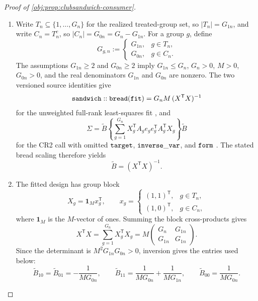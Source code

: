 \begin{proof}[Proof of \cref{obj:prop:clubsandwich-consumer}]
\begin{enumerate}
\item
Write \(T_n\subseteq\{1,\ldots,G_n\}\) for the realized treated-group set, so
\(|T_n|=G_{1n}\), and write \(C_n=T_n^{c}\), so
\(|C_n|=G_{0n}=G_n-G_{1n}\).  For a group \(g\), define
\[
G_{g,n}:=
\begin{cases}
G_{1n},& g\in T_n,\\
G_{0n},& g\in C_n.
\end{cases}
\]
The assumptions \(G_{1n}\ge2\) and \(G_{0n}\ge2\) imply \(G_{1n}\le G_n\),
\(G_n>0\), \(M>0\), \(G_{0n}>0\), and the real denominators
\(G_{1n}\) and \(G_{0n}\) are nonzero.  The two versioned source identities give
\[
{\tt sandwich::bread}({\tt fit})
=
G_nM\,(X^{\mathsf T}X)^{-1}
\]
for the unweighted full-rank least-squares fit
\citep[R/bread.R, lines 10--15]{Sandwich2026}, and
\[
\Sigma
=
\widetilde B
\left\{
\sum_{g=1}^{G_n}X_g^{\mathsf T}A_ge_ge_g^{\mathsf T}A_g^{\mathsf T}X_g
\right\}
\widetilde B
\]
for the CR2 call with omitted \({\tt target}\), \({\tt inverse\_var}\), and
\({\tt form}\)
\citep[R/lm.R, lines 47--52 and 70--72; R/S3-methods.R, lines 21--33 and
63--65; R/clubSandwich.R, lines 167--175, 216--225, and 237--287;
R/CR-adjustments.R, lines 5--7 and 22--42]{ClubSandwich2026}.  The stated bread
scaling therefore yields
\[
\widetilde B=(X^{\mathsf T}X)^{-1}.
\]

\item
The fitted design has group block
\[
X_g=\mathbf 1_M x_g^{\mathsf T},
\qquad
x_g=
\begin{cases}
(1,1)^{\mathsf T},& g\in T_n,\\
(1,0)^{\mathsf T},& g\in C_n,
\end{cases}
\]
where \(\mathbf 1_M\) is the \(M\)-vector of ones.  Summing the block
cross-products gives
\[
X^{\mathsf T}X
=
\sum_{g=1}^{G_n}X_g^{\mathsf T}X_g
=
M
\begin{pmatrix}
G_n&G_{1n}\\
G_{1n}&G_{1n}
\end{pmatrix}.
\]
Since the determinant is \(M^2G_{1n}G_{0n}>0\), inversion gives the entries used
below:
\[
\widetilde B_{10}=\widetilde B_{01}
=-\frac{1}{MG_{0n}},
\qquad
\widetilde B_{11}
=
\frac{1}{MG_{0n}}+\frac{1}{MG_{1n}},
\qquad
\widetilde B_{00}
=
\frac{1}{MG_{0n}}.
\]


\end{enumerate}
\end{proof}
